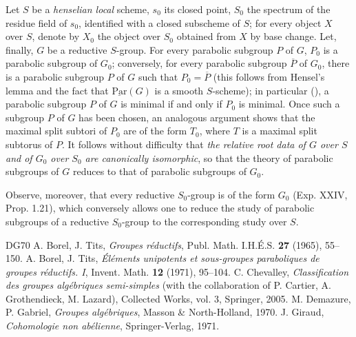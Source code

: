 \label{XXVI.7.15}
Let $S$ be a \emph{henselian local} scheme, $s_0$ its closed point, $S_0$ the spectrum of the residue field of $s_0$, identified with a closed subscheme of $S$; for every object $X$ over $S$, denote by $X_0$ the object over $S_0$ obtained from $X$ by base change. Let, finally, $G$ be a reductive $S$-group. For every parabolic subgroup $P$ of $G$, $P_0$ is a parabolic subgroup of $G_0$; conversely, for every parabolic subgroup $\overline P$ of $G_0$, there is a parabolic subgroup $P$ of $G$ such that $P_0=\overline P$ (this follows from Hensel's lemma and the fact that $\underline{\mathrm{Par}}(G)$ is a smooth $S$-scheme); in particular (), a parabolic subgroup $P$ of $G$ is minimal if and only if $P_0$ is minimal. Once such a subgroup $P$ of $G$ has been chosen, an analogous argument shows that the maximal split subtori of $P_0$ are of the form $T_0$, where $T$ is a maximal split subtorus of $P$. It follows without difficulty that \emph{the relative root data of $G$ over $S$ and of $G_0$ over $S_0$ are canonically isomorphic}, so that the theory of parabolic subgroups of $G$ reduces to that of parabolic subgroups of $G_0$.

Observe, moreover, that every reductive $S_0$-group is of the form $G_0$ (Exp. XXIV, Prop. 1.21), which conversely allows one to reduce the study of parabolic subgroups of a reductive $S_0$-group to the corresponding study over $S$.

\begin{thebibliography}{DG70}
 A. Borel, J. Tits, \textit{Groupes réductifs}, Publ. Math. I.H.É.S. \textbf{27} (1965), 55--150.
 A. Borel, J. Tits, \textit{Éléments unipotents et sous-groupes paraboliques de groupes réductifs. I}, Invent. Math. \textbf{12} (1971), 95--104.
 C. Chevalley, \textit{Classification des groupes algébriques semi-simples} (with the collaboration of P. Cartier, A. Grothendieck, M. Lazard), Collected Works, vol. 3, Springer, 2005.
 M. Demazure, P. Gabriel, \textit{Groupes algébriques}, Masson \& North-Holland, 1970.
 J. Giraud, \textit{Cohomologie non abélienne}, Springer-Verlag, 1971.
\end{thebibliography}
